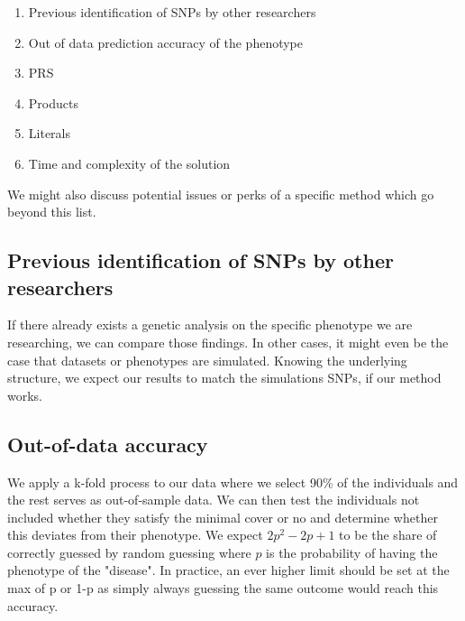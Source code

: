 \documentclass[letterpaper, 11pt]{article}
\begin{document}
\begin{enumerate}
\item Previous identification of SNPs by other researchers
\item Out of data prediction accuracy of the phenotype
\item PRS 
\item Products 
\item Literals
\item Time and complexity of the solution\end{enumerate}

We might also discuss potential issues or perks of a specific method which go beyond this list. 

\subsection{Previous identification of SNPs by other researchers}
If there already exists a genetic analysis on the specific phenotype we are researching, we can compare those findings. 
In other cases, it might even be the case that datasets or phenotypes are simulated. Knowing the underlying structure, we expect our results to match the simulations SNPs, if our method works. 
\subsection{Out-of-data accuracy}
We apply  a k-fold process to our data where we select 90\% of the individuals and the rest serves as out-of-sample data. We can then test the individuals not included whether they satisfy the minimal cover or no and determine whether this deviates from their phenotype.  We expect $2p^2-2p+1$ to be the share of correctly guessed by random guessing where $p$ is the probability of having the phenotype of the "disease". In practice, an ever higher limit should be set at  the max of p  or 1-p as simply always guessing the same outcome would reach this accuracy. 
\end{document}
